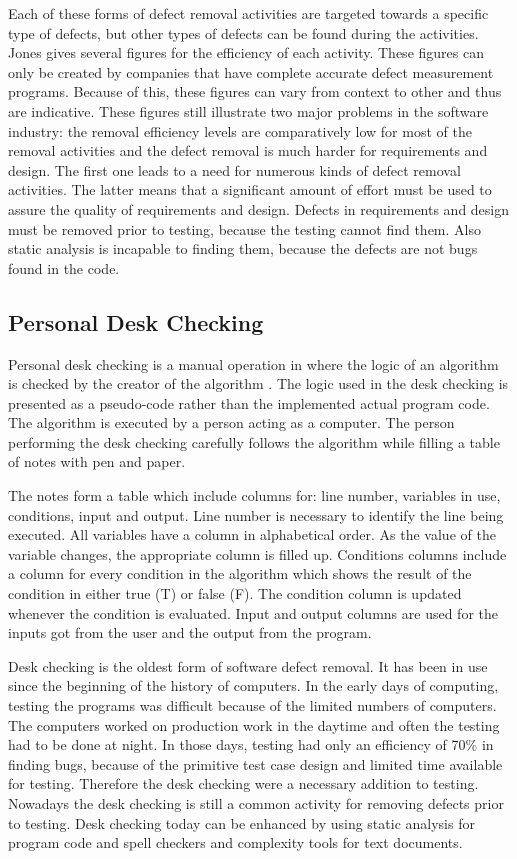 Each of these forms of defect removal activities are targeted towards a specific type of defects, but other types of defects can be found during the activities. Jones gives several figures for the efficiency of each activity. These figures can only be created by companies that have complete accurate defect measurement programs. Because of this, these figures can vary from context to other and thus are indicative. These figures still illustrate two major problems in the software industry: the removal efficiency levels are comparatively low for most of the removal activities and the defect removal is much harder for requirements and design. The first one leads to a need for numerous kinds of defect removal activities. The latter means that a significant amount of effort must be used to assure the quality of requirements and design. Defects in requirements and design must be removed prior to testing, because the testing cannot find them. Also static analysis is incapable to finding them, because the defects are not bugs found in the code.



\subsection{Personal Desk Checking} 
Personal desk checking is a manual operation in where the logic of an algorithm is checked by the creator of the algorithm . The logic used in the desk checking is presented as a pseudo-code rather than the implemented actual program code. The algorithm is executed by a person acting as a computer. The person performing the desk checking carefully follows the algorithm while filling a table of notes with pen and paper. 

The notes form a table which include columns for: line number, variables in use, conditions, input and output. Line number is necessary to identify the line being executed. All variables have a column in alphabetical order. As the value of the variable changes, the appropriate column is filled up. Conditions columns include a column for every condition in the algorithm which shows the result of the condition in either true (T) or false (F). The condition column is updated whenever the condition is evaluated. Input and output columns are used for the inputs got from the user and the output from the program.~\cite{campionDescCheck}

Desk checking is the oldest form of software defect removal. It has been in use since the beginning of the history of computers. In the early days of computing, testing the programs was difficult because of the limited numbers of computers. The computers worked on production work in the daytime and often the testing had to be done at night. In those days, testing had only an efficiency of 70\% in finding bugs, because of the primitive test case design and limited time available for testing. Therefore the desk checking were a necessary addition to testing. Nowadays the desk checking is still a common activity for removing defects prior to testing. Desk checking today can be enhanced by using static analysis for program code and spell checkers and complexity tools for text documents.

